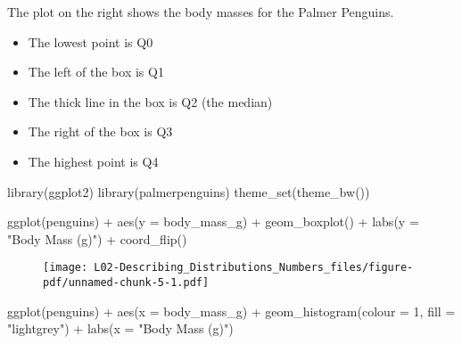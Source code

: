 \documentclass[
  letterpaper,
  DIV=11,
  numbers=noendperiod]{scrreprt}
\newenvironment{Shaded}{\begin{snugshade}}{\end{snugshade}}
\newcommand{\AttributeTok}[1]{\textcolor[rgb]{0.40,0.45,0.13}{#1}}
\newcommand{\DecValTok}[1]{\textcolor[rgb]{0.68,0.00,0.00}{#1}}
\newcommand{\FunctionTok}[1]{\textcolor[rgb]{0.28,0.35,0.67}{#1}}
\newcommand{\NormalTok}[1]{\textcolor[rgb]{0.00,0.23,0.31}{#1}}
\newcommand{\SpecialCharTok}[1]{\textcolor[rgb]{0.37,0.37,0.37}{#1}}
\newcommand{\StringTok}[1]{\textcolor[rgb]{0.13,0.47,0.30}{#1}}
\providecommand{\tightlist}{%
  \setlength{\itemsep}{0pt}\setlength{\parskip}{0pt}}\usepackage{longtable,booktabs,array}
\begin{document}
\vspace{1cm}

The plot on the right shows the body masses for the Palmer Penguins.

\begin{itemize}
\tightlist
\item
  The lowest point is Q0
\item
  The left of the box is Q1
\item
  The thick line in the box is Q2 (the median)
\item
  The right of the box is Q3
\item
  The highest point is Q4
\end{itemize}

\begin{Shaded}
\begin{Highlighting}[]
\FunctionTok{library}\NormalTok{(ggplot2)}
\FunctionTok{library}\NormalTok{(palmerpenguins)}
\FunctionTok{theme\_set}\NormalTok{(}\FunctionTok{theme\_bw}\NormalTok{())}

\FunctionTok{ggplot}\NormalTok{(penguins) }\SpecialCharTok{+} 
    \FunctionTok{aes}\NormalTok{(}\AttributeTok{y =}\NormalTok{ body\_mass\_g) }\SpecialCharTok{+}
    \FunctionTok{geom\_boxplot}\NormalTok{() }\SpecialCharTok{+}
    \FunctionTok{labs}\NormalTok{(}\AttributeTok{y =} \StringTok{"Body Mass (g)"}\NormalTok{) }\SpecialCharTok{+}
    \FunctionTok{coord\_flip}\NormalTok{()}
\end{Highlighting}
\end{Shaded}

\begin{figure}[H]

{\centering \texttt{[image: L02-Describing\_Distributions\_Numbers\_files/figure-pdf/unnamed-chunk-5-1.pdf]}

}

\end{figure}

\begin{Shaded}
\begin{Highlighting}[]
\FunctionTok{ggplot}\NormalTok{(penguins) }\SpecialCharTok{+} 
    \FunctionTok{aes}\NormalTok{(}\AttributeTok{x =}\NormalTok{ body\_mass\_g) }\SpecialCharTok{+}
    \FunctionTok{geom\_histogram}\NormalTok{(}\AttributeTok{colour =} \DecValTok{1}\NormalTok{, }\AttributeTok{fill =} \StringTok{"lightgrey"}\NormalTok{) }\SpecialCharTok{+}
    \FunctionTok{labs}\NormalTok{(}\AttributeTok{x =} \StringTok{"Body Mass (g)"}\NormalTok{)}
\end{Highlighting}
\end{Shaded}
\end{document}
